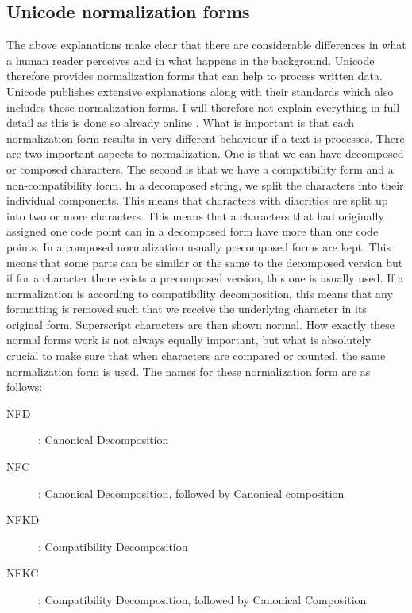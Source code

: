 \subsection{Unicode normalization forms}
The above explanations make clear that there are considerable differences in what a human reader perceives and in what happens in the background. Unicode therefore provides normalization forms that can help to process written data.  Unicode publishes extensive explanations along with their standards which also includes those normalization forms. I will therefore not explain everything in full detail as this is done so already online \citep{Unicode.27.08.2021}. What is important is that each normalization form results in very different behaviour if a text is processes. There are two important aspects to normalization. One is that we can have decomposed or composed characters. The second is that we have a compatibility form and a non-compatibility form. In a decomposed string, we split the characters into their individual components. This means that characters with diacritics are split up into two or more characters. This means that a characters that had originally assigned one code point can in a decomposed form have more than one code points. In a composed normalization usually precomposed forms are kept. This means that some parts can be similar or the same to the decomposed version but if for a character there exists a precomposed version, this one is usually used. If a normalization is according to compatibility decomposition, this means that any formatting is removed such that we receive the underlying character in its original form. Superscript characters are then shown normal. How exactly these normal forms work is not always equally important, but what is absolutely crucial to make sure that when characters are compared or counted, the same normalization form is used.  The names for these normalization form are as follows:

\begin{description}
\item[NFD] : Canonical Decomposition
\item[NFC] : Canonical Decomposition, followed by Canonical composition
\item[NFKD] : Compatibility Decomposition
\item[NFKC] : Compatibility Decomposition, followed by Canonical Composition
\end{description}


